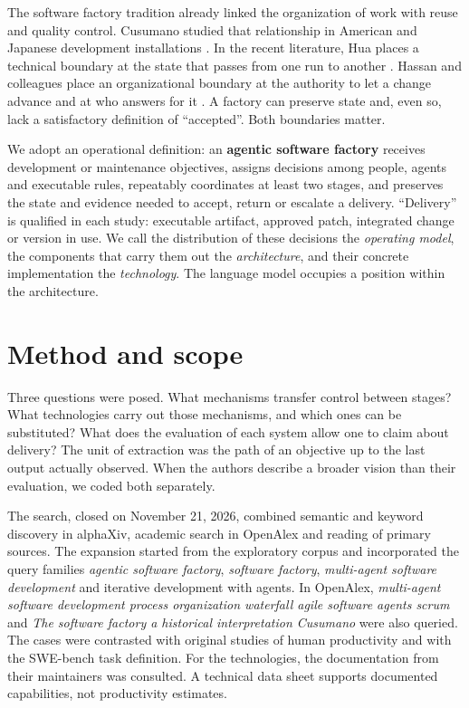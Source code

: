 \documentclass[11pt,a4paper]{article}
\begin{document}
The software factory tradition already linked the organization of work with reuse and quality control. Cusumano studied that relationship in American and Japanese development installations \citep{cusumano}. In the recent literature, Hua places a technical boundary at the state that passes from one run to another \citep{hua}. Hassan and colleagues place an organizational boundary at the authority to let a change advance and at who answers for it \citep{hassan}. A factory can preserve state and, even so, lack a satisfactory definition of ``accepted''. Both boundaries matter.

We adopt an operational definition: an \textbf{agentic software factory} receives development or maintenance objectives, assigns decisions among people, agents and executable rules, repeatably coordinates at least two stages, and preserves the state and evidence needed to accept, return or escalate a delivery. ``Delivery'' is qualified in each study: executable artifact, approved patch, integrated change or version in use. We call the distribution of these decisions the \emph{operating model}, the components that carry them out the \emph{architecture}, and their concrete implementation the \emph{technology}. The language model occupies a position within the architecture.

\section{Method and scope}
Three questions were posed. What mechanisms transfer control between stages? What technologies carry out those mechanisms, and which ones can be substituted? What does the evaluation of each system allow one to claim about delivery? The unit of extraction was the path of an objective up to the last output actually observed. When the authors describe a broader vision than their evaluation, we coded both separately.

The search, closed on November 21, 2026, combined semantic and keyword discovery in alphaXiv, academic search in OpenAlex and reading of primary sources. The expansion started from the exploratory corpus and incorporated the query families \textit{agentic software factory}, \textit{software factory}, \textit{multi-agent software development} and iterative development with agents. In OpenAlex, \textit{multi-agent software development process organization waterfall agile software agents scrum} and \textit{The software factory a historical interpretation Cusumano} were also queried. The cases were contrasted with original studies of human productivity and with the SWE-bench task definition. For the technologies, the documentation from their maintainers was consulted. A technical data sheet supports documented capabilities, not productivity estimates.
\end{document}
